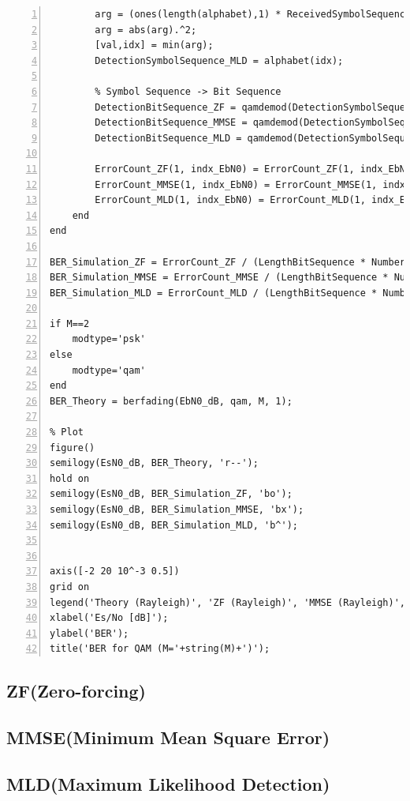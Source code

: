 \documentclass{article}
\begin{document}
\begin{lstlisting}[style=Matlab-editor,
frame=single,
numbers=left,]
        % MLD Receiver
        arg = (ones(length(alphabet),1) * ReceivedSymbolSequence) - (alphabet.' * H);
        arg = abs(arg).^2;
        [val,idx] = min(arg);
        DetectionSymbolSequence_MLD = alphabet(idx);

        % Symbol Sequence -> Bit Sequence
        DetectionBitSequence_ZF = qamdemod(DetectionSymbolSequence_ZF.', M, 'OutputType', 'bit', 'UnitAveragePower', 1)';
        DetectionBitSequence_MMSE = qamdemod(DetectionSymbolSequence_MMSE.', M, 'OutputType', 'bit', 'UnitAveragePower', 1)';
        DetectionBitSequence_MLD = qamdemod(DetectionSymbolSequence_MLD.', M, 'OutputType', 'bit', 'UnitAveragePower', 1)';

        ErrorCount_ZF(1, indx_EbN0) = ErrorCount_ZF(1, indx_EbN0) + sum(DetectionBitSequence_ZF~=BitSequence);
        ErrorCount_MMSE(1, indx_EbN0) = ErrorCount_MMSE(1, indx_EbN0) + sum(DetectionBitSequence_MMSE~=BitSequence);
        ErrorCount_MLD(1, indx_EbN0) = ErrorCount_MLD(1, indx_EbN0) + sum(DetectionBitSequence_MLD~=BitSequence);
    end
end

BER_Simulation_ZF = ErrorCount_ZF / (LengthBitSequence * NumberIteration);
BER_Simulation_MMSE = ErrorCount_MMSE / (LengthBitSequence * NumberIteration);
BER_Simulation_MLD = ErrorCount_MLD / (LengthBitSequence * NumberIteration);

if M==2
    modtype='psk'
else
    modtype='qam'
end
BER_Theory = berfading(EbN0_dB, qam, M, 1);

% Plot
figure()
semilogy(EsN0_dB, BER_Theory, 'r--');
hold on
semilogy(EsN0_dB, BER_Simulation_ZF, 'bo');
semilogy(EsN0_dB, BER_Simulation_MMSE, 'bx');
semilogy(EsN0_dB, BER_Simulation_MLD, 'b^');


axis([-2 20 10^-3 0.5])
grid on
legend('Theory (Rayleigh)', 'ZF (Rayleigh)', 'MMSE (Rayleigh)', 'MLD (Rayleigh)');
xlabel('Es/No [dB]');
ylabel('BER');
title('BER for QAM (M='+string(M)+')');
\end{lstlisting}
\subsection{ZF(Zero-forcing)}
\subsection{MMSE(Minimum Mean Square Error)}
\subsection{MLD(Maximum Likelihood Detection)}
\end{document}
